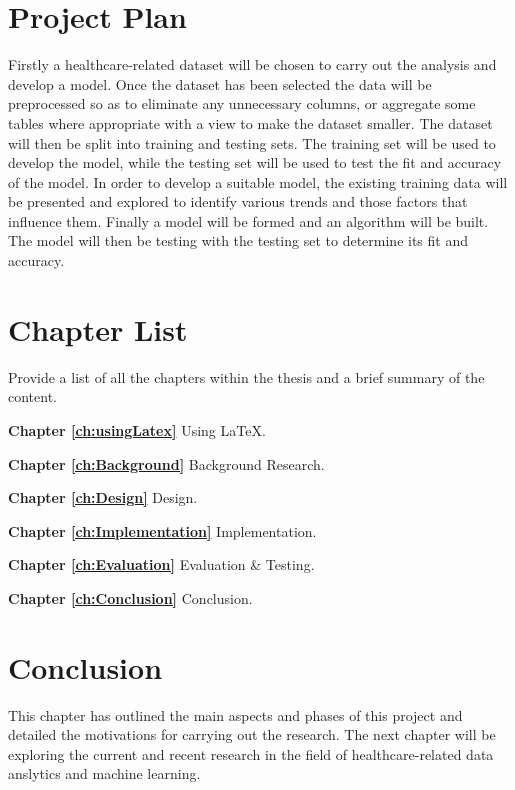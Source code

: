 \section{Project Plan}
Firstly a healthcare-related dataset will be chosen to carry out the analysis and develop a model. Once the dataset has been selected the data will be preprocessed so as to eliminate any unnecessary columns, or aggregate some tables where appropriate with a view to make the dataset smaller.
The dataset will then be split into training and testing sets. The training set will be used to develop the model, while the testing set will be used to test the fit and accuracy of the model.
In order to develop a suitable model, the existing training data will be presented and explored to identify various trends and those factors that influence them.
Finally a model will be formed and an algorithm will be built.
The model will then be testing with the testing set to determine its fit and accuracy.


\section{Chapter List}
Provide a list of all the chapters within the thesis and a brief summary of the content.

\textbf{Chapter \ref{ch:usingLatex}} Using \LaTeX. 

\textbf{Chapter \ref{ch:Background}} Background Research. 

\textbf{Chapter \ref{ch:Design}} Design. 

\textbf{Chapter \ref{ch:Implementation}} Implementation. 

\textbf{Chapter \ref{ch:Evaluation}} Evaluation \& Testing. 

\textbf{Chapter \ref{ch:Conclusion}} Conclusion. 


\section{Conclusion}
This chapter has outlined the main aspects and phases of this project and detailed the motivations for carrying out the research. 
The next chapter will be exploring the current and recent research in the field of healthcare-related data anslytics and machine learning.
